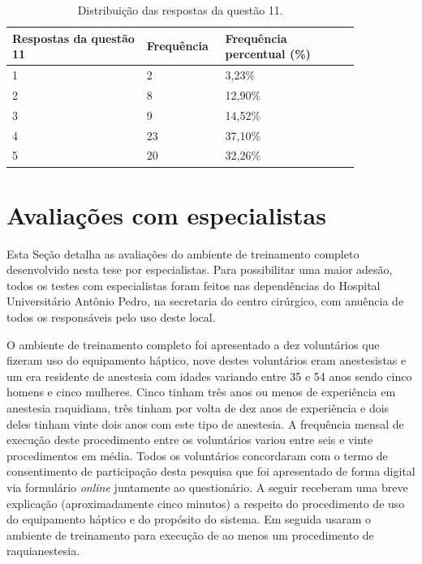 \begin{table}[!ht]
\begin{center}
\caption{Distribuição das respostas da questão 11.}
\label{tab:tabelaRespostasModoTutorial}
\begin{tabular}{|p{0.35\linewidth}|p{0.15\linewidth}|p{0.35\linewidth}|}
\hline
\textbf{Respostas da questão 11} & \textbf{Frequência} & \textbf{Frequência percentual (\%)}\\
\hline\hline
1 & 2 & 3,23\%\\
2 & 8 & 12,90\%\\
3 & 9 & 14,52\%\\
4 & 23 & 37,10\%\\
5 & 20 & 32,26\%\\
\hline
\end{tabular}
\end{center}
\end{table}

\section{Avaliações com especialistas}
\label{sec:testeEspecialistas}

Esta Seção detalha as avaliações do ambiente de treinamento completo desenvolvido nesta tese por especialistas. Para possibilitar uma maior adesão, todos os testes com especialistas foram feitos nas dependências do Hospital Universitário Antônio Pedro, na secretaria do centro cirúrgico, com anuência de todos os responsáveis pelo uso deste local.

O ambiente de treinamento completo foi apresentado a dez voluntários que fizeram uso do equipamento háptico, nove destes voluntários eram anestesistas e um era residente de anestesia com idades variando entre 35 e 54 anos sendo cinco homens e cinco mulheres. Cinco tinham três anos ou menos de experiência em anestesia raquidiana, três tinham por volta de dez anos de experiência e dois deles tinham vinte dois anos com este tipo de anestesia. A frequência mensal de execução deste procedimento entre os voluntários variou entre seis e vinte procedimentos em média. Todos os voluntários concordaram com o termo de consentimento de participação desta pesquisa que foi apresentado de forma digital via formulário \textit{online} juntamente ao questionário. A seguir receberam uma breve explicação (aproximadamente cinco minutos) a respeito do procedimento de uso do equipamento háptico e do propósito do sistema. Em seguida usaram o ambiente de treinamento para execução de ao menos um procedimento de raquianestesia. 

